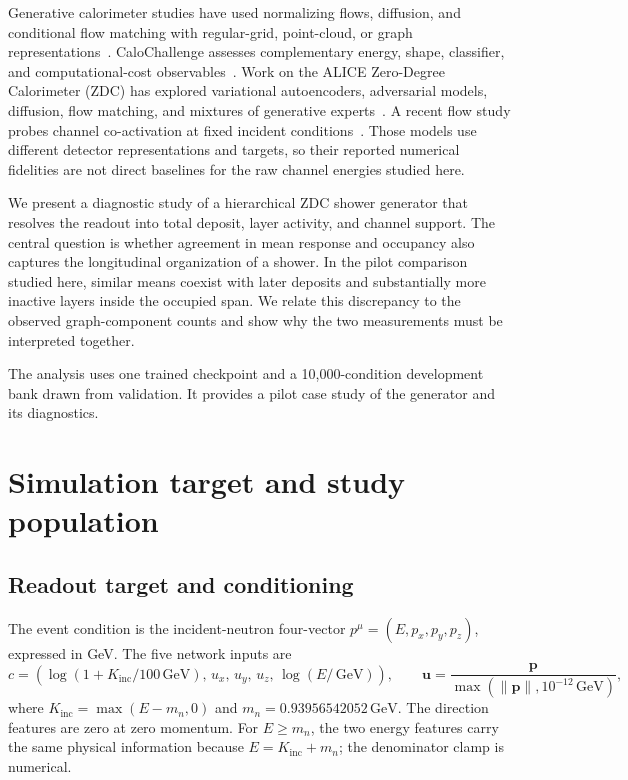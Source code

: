 \documentclass[11pt]{article}
\newcommand{\GeV}{\,\mathrm{GeV}}
\newcommand{\Kinc}{K_{\mathrm{inc}}}
\begin{document}
Generative calorimeter studies have used normalizing flows, diffusion, and conditional flow matching with regular-grid, point-cloud, or graph representations~\cite{caloflow,calodiffusion,calograph,caloclouds2,calodream}. CaloChallenge assesses complementary energy, shape, classifier, and computational-cost observables~\cite{calochallenge,kansalmetrics}. Work on the ALICE Zero-Degree Calorimeter (ZDC) has explored variational autoencoders, adversarial models, diffusion, flow matching, and mixtures of generative experts~\cite{dubinskizdc,kitazdc,fasterzdc,expertsim,wojnar2025}. A recent flow study probes channel co-activation at fixed incident conditions~\cite{majerz2026}. Those models use different detector representations and targets, so their reported numerical fidelities are not direct baselines for the raw channel energies studied here.

We present a diagnostic study of a hierarchical ZDC shower generator that resolves the readout into total deposit, layer activity, and channel support. The central question is whether agreement in mean response and occupancy also captures the longitudinal organization of a shower. In the pilot comparison studied here, similar means coexist with later deposits and substantially more inactive layers inside the occupied span. We relate this discrepancy to the observed graph-component counts and show why the two measurements must be interpreted together.

The analysis uses one trained checkpoint and a 10,000-condition development bank drawn from validation. It provides a pilot case study of the generator and its diagnostics.

\section{Simulation target and study population}
\label{sec:data}

\subsection{Readout target and conditioning}

The event condition is the incident-neutron four-vector $p^\mu=(E,p_x,p_y,p_z)$, expressed in GeV. The five network inputs are
\begin{equation}
 c=\left(\log(1+\Kinc/100\GeV),\,u_x,\,u_y,\,u_z,\,\log(E/\GeV)\right),
 \qquad \mathbf u=\frac{\mathbf p}{\max(\lVert\mathbf p\rVert,10^{-12}\GeV)},
 \label{eq:condition}
\end{equation}
where $\Kinc=\max(E-m_n,0)$ and $m_n=0.93956542052\GeV$. The direction features are zero at zero momentum. For $E\geq m_n$, the two energy features carry the same physical information because $E=\Kinc+m_n$; the denominator clamp is numerical.
\end{document}
